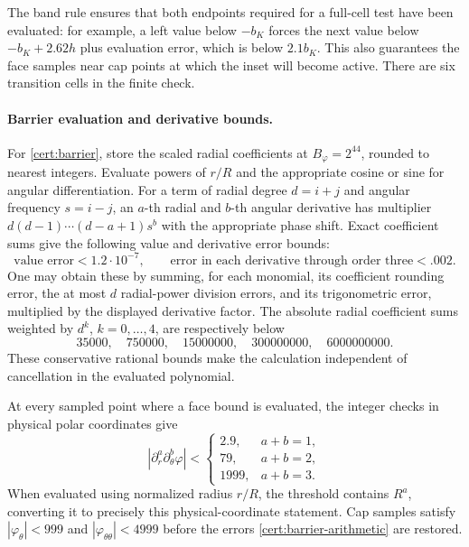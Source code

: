 The band rule ensures that both endpoints required for a full-cell test have been
evaluated: for example, a left value below $-b_K$ forces the next value
below $-b_K+2.62h$ plus evaluation error, which is below $2.1b_K$.
This also guarantees the face samples near cap points at which the inset
will become active.  There are six transition cells in the finite check.

\paragraph{Barrier evaluation and derivative bounds.}
For \eqref{cert:barrier}, store the scaled radial coefficients at
$B_\varphi=2^{44}$, rounded to nearest integers.  Evaluate powers of
$r/R$ and the appropriate cosine or sine for angular differentiation.
For a term of radial degree $d=i+j$ and angular frequency $s=i-j$, an
$a$-th radial and $b$-th angular derivative has multiplier
$d(d-1)\cdots(d-a+1)s^b$ with the appropriate phase shift.  Exact
coefficient sums give the following value and derivative error bounds:
\begin{equation}\label{cert:barrier-arithmetic}
 \text{value error}<1.2\cdot10^{-7},\qquad
 \text{error in each derivative through order three}<.002.
\end{equation}
One may obtain these by summing, for each monomial, its coefficient
rounding error, the at most $d$ radial-power division errors, and its
trigonometric error, multiplied by the displayed derivative factor.
The absolute radial coefficient sums weighted by $d^k$, $k=0,\ldots,4$,
are respectively below
\[
 35000,\quad750000,\quad15000000,\quad300000000,\quad6000000000.
\]
These conservative rational bounds make the calculation independent of
cancellation in the evaluated polynomial.

At every sampled point where a face bound is evaluated, the integer
checks in physical polar coordinates give
\begin{equation}\label{cert:face-jet-tests}
 |\partial_r^a\partial_\theta^b\varphi|<
 \begin{cases}2.9,&a+b=1,\\79,&a+b=2,\\1999,&a+b=3.\end{cases}
\end{equation}
When evaluated using normalized radius $r/R$, the threshold contains
$R^a$, converting it to precisely this physical-coordinate statement.
Cap samples satisfy $|\varphi_\theta|<999$ and
$|\varphi_{\theta\theta}|<4999$ before the errors
\eqref{cert:barrier-arithmetic} are restored.

